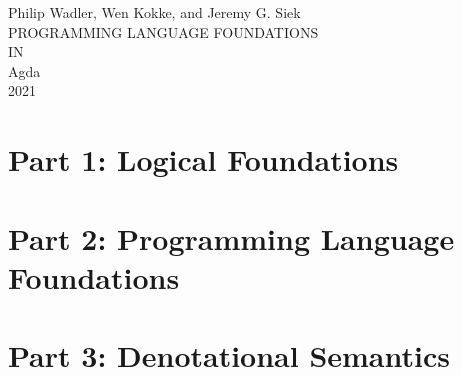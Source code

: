 \documentclass[10pt]{book}
\begin{document}
\setlength{\mathindent}{0pt}

\providecommand{\tightlist}{%
  \setlength{\itemsep}{0pt}\setlength{\parskip}{0pt}}

\begin{titlepage}
  \newlength{\drop}
  \setlength{\drop}{0.12\textheight}%
  \centering%
  \begingroup%
  \vspace*{\drop}%
  {\large Philip Wadler, Wen Kokke, and Jeremy G. Siek}\\[\baselineskip]
  {\Huge PROGRAMMING LANGUAGE FOUNDATIONS}\\[\baselineskip]
  {\Large IN}\\[\baselineskip]
  {\Huge Agda}\\[\drop]
  \vfill%
  {\small\scshape 2021}\par%
  \null\endgroup
\end{titlepage}

\frontmatter
\setcounter{tocdepth}{0}

\tableofcontents
\setcounter{tocdepth}{1}





\mainmatter
\part{Part 1: Logical Foundations}











\part{Part 2: Programming Language Foundations}










\part{Part 3: Denotational Semantics}






\cleardoublepage%
%

\appendix
{}




\end{document}
